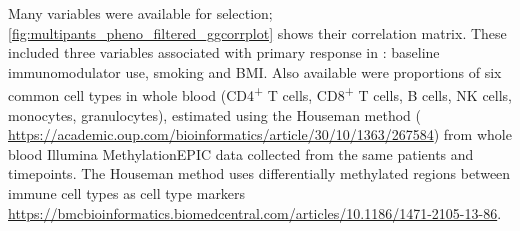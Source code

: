 Many variables were available for selection;
\autoref{fig:multipants_pheno_filtered_ggcorrplot} shows their correlation matrix.
These included three variables associated with primary response in \textcite{kennedy2019PredictorsAntiTNFTreatment}: baseline immunomodulator use, smoking and \gls{BMI}.
Also available were proportions of six common cell types in whole blood 
(CD4\textsuperscript{+} T cells, CD8\textsuperscript{+} T cells, B cells, \gls{NK} cells, monocytes, granulocytes),
estimated using the Houseman method ( \url{https://academic.oup.com/bioinformatics/article/30/10/1363/267584})
from whole blood Illumina MethylationEPIC data collected from the same patients and timepoints.
The Houseman method uses differentially methylated regions between immune cell types as cell type markers \url{https://bmcbioinformatics.biomedcentral.com/articles/10.1186/1471-2105-13-86}.

